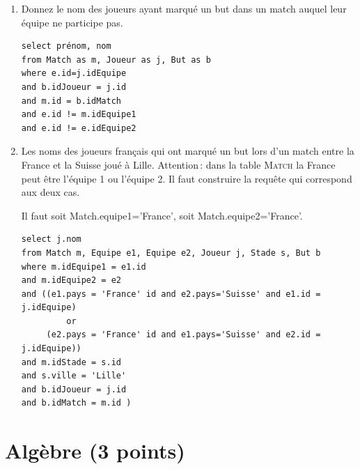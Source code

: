 \begin{enumerate}
\item Donnez le nom des joueurs ayant marqué un but dans un match auquel leur équipe
    ne participe pas.  

\begin{solution}
\begin{verbatim}
select prénom, nom
from Match as m, Joueur as j, But as b
where e.id=j.idEquipe
and b.idJoueur = j.id
and m.id = b.idMatch
and e.id != m.idEquipe1
and e.id != e.idEquipe2
\end{verbatim}
\end{solution}


\item Les noms des joueurs français qui ont marqué un but lors d'un match entre la France et la Suisse 
    joué à Lille. Attention\,:  dans la table \textsc{Match}
    la France peut être l'équipe 1 ou l'équipe 2. Il faut
      construire la requête qui correspond aux deux cas.
     
\begin{solution}
Il faut soit Match.equipe1='France', soit  Match.equipe2='France'. 
\begin{verbatim}
select j.nom
from Match m, Equipe e1, Equipe e2, Joueur j, Stade s, But b
where m.idEquipe1 = e1.id 
and m.idEquipe2 = e2
and ((e1.pays = 'France' id and e2.pays='Suisse' and e1.id = j.idEquipe)
         or
     (e2.pays = 'France' id and e1.pays='Suisse' and e2.id = j.idEquipe))
and m.idStade = s.id 
and s.ville = 'Lille' 
and b.idJoueur = j.id 
and b.idMatch = m.id )
\end{verbatim}
\end{solution}


\end{enumerate}

\section{Algèbre (3 points)}



